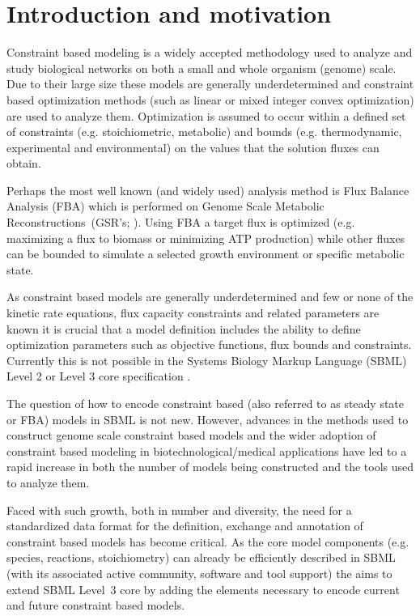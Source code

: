 
\section{ Introduction and motivation } \label{intro}

Constraint based modeling is a widely accepted methodology used to
analyze and study biological networks on both a small and whole organism
(genome) scale. Due to their large size these models are generally underdetermined and constraint based optimization methods (such as linear or mixed integer convex optimization) are used to analyze them. Optimization is assumed to occur within a defined set of constraints (e.g. stoichiometric, metabolic) and bounds (e.g. thermodynamic, experimental and environmental) on the values that the solution fluxes can obtain.

Perhaps the most well known (and widely used) analysis method is Flux
Balance Analysis (FBA) which is performed on Genome Scale Metabolic Reconstructions~(GSR's; \citealt{oberhardt_2009}). Using FBA a
target flux is optimized (e.g. maximizing a flux to biomass or
minimizing ATP production) while other fluxes can be bounded to simulate
a selected growth environment or specific metabolic state.

As constraint based models are generally underdetermined and few or
none of the kinetic rate equations, flux capacity constraints and related parameters are known it is crucial that a model definition includes the ability to define optimization parameters such as objective functions, flux bounds and constraints. Currently this is not possible in the Systems Biology
Markup Language (SBML) Level 2 or Level 3 core specification
\citep{sbml, sbml3core}.

The question of how to encode constraint based (also referred to as
steady state or FBA) models in SBML is not new. However, advances in the
methods used to construct genome scale constraint based models and the
wider adoption of constraint based modeling in biotechnological/medical
applications have led to a rapid increase in both the number of models
being constructed and the tools used to analyze them.

Faced with such growth, both in number and diversity, the need for a
standardized data format for the definition, exchange and annotation of
constraint based models has become critical. As the core model
components (e.g. species, reactions, stoichiometry) can already be
efficiently described in SBML (with its associated active community,
software and tool support) the \FBCPackage aims to extend SBML Level~3
core by adding the elements necessary to encode current and future
constraint based models.

